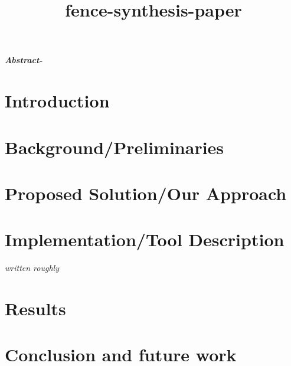 \documentclass{article}
\title{fence-synthesis-paper}
\date{}
\newcommand{\ishComment}[1]{\textit{\color{red}\tiny{#1}}}
\begin{document}
\maketitle
\textit{\textbf{Abstract-}}

\section{Introduction} \label{sec:intro}


\section{Background/Preliminaries} \label{sec:intro}


\section{Proposed Solution/Our Approach}\label{sec:approach}


\section{Implementation/Tool Description}
\ishComment{written roughly}


\section{Results}

\section{Conclusion and future work}



\end{document}
